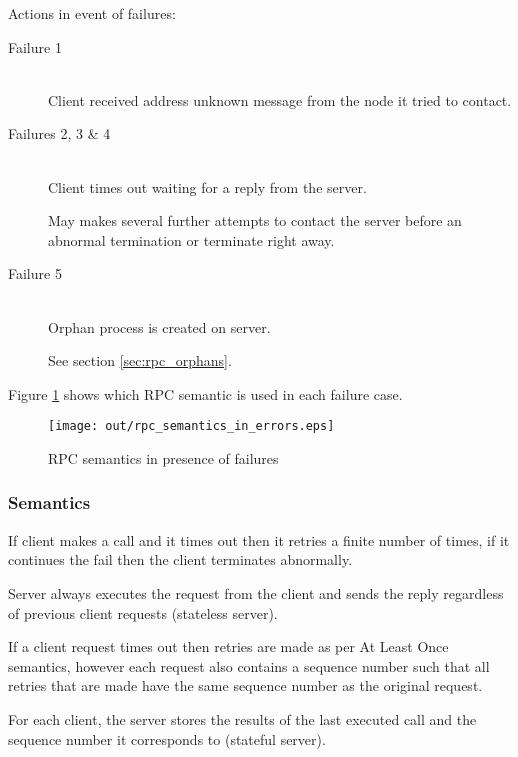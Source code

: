 \documentclass[a4paper]{article}
\begin{document}
Actions in event of failures:

\begin{description}
  \item[Failure 1] \hfill \\
    Client received address unknown message from the node it tried to contact.

  \item[Failures 2, 3 \& 4] \hfill \\
    Client times out waiting for a reply from the server.

    May makes several further attempts to contact the server before an abnormal
    termination or terminate right away.

  \item[Failure 5] \hfill \\
    Orphan process is created on server.

    See section \ref{sec:rpc_orphans}.

\end{description}

Figure \ref{fig:rpc_semantics_in_errors} shows which RPC semantic is used in
each failure case.

\begin{figure}[h!]
  \centering
  \texttt{[image: out/rpc\_semantics\_in\_errors.eps]}
  \caption{RPC semantics in presence of failures}
  \label{fig:rpc_semantics_in_errors}
\end{figure}
\FloatBarrier

\subsubsection{Semantics}


If client makes a call and it times out then it retries a finite number of
times, if it continues the fail then the client terminates abnormally.

Server always executes the request from the client and sends the reply
regardless of previous client requests (stateless server).


If a client request times out then retries are made as per At Least Once
semantics, however each request also contains a sequence number such that all
retries that are made have the same sequence number as the original request.

For each client, the server stores the results of the last executed call and the
sequence number it corresponds to (stateful server).
\end{document}
